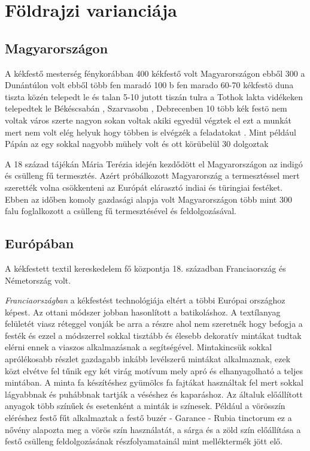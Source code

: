 \documentclass[fontsize=12pt, appendixprefix=true]{scrreprt}
\begin{document}
\section{Földrajzi varianciája}
\subsection{Magyarországon}
A kékfestő mesterség fénykorábban 400 kékfestő volt Magyarországon ebből 300 a Dunántúlon volt ebből több fen maradó 100 b fen marado 60-70 kékfestö duna tiszta közén telepedt le és talan 5-10 jutott tiszán tulra a Tothok lakta vidékeken telepedtek  le Békéscsabán , Szarvasobn , Debrecenben 
10 több kék festö nem voltak város szerte 
nagyon sokan voltak akiki egyedül végztek el ezt a munkát mert nem volt elég helyuk hogy többen is elvégzék a feladatokat .
Mint például Pápán az egy sokkal nagyobb mühely volt és ott körübelül 30 dolgoztak 

A 18 század tájékán Mária Terézia idején kezdődött el Magyarországon az indigó és csülleng fű termesztés.
Azért próbálkozott Magyarország a termesztéssel mert szerették volna csökkenteni az Európát elárasztó indiai és türingiai festéket.
Ebben az időben komoly gazdasági alapja volt Magyarországon több mint 300 falu foglalkozott a csülleng fű termesztésével  és feldolgozásával.
   

\subsection{Európában}
A kékfestett textil kereskedelem fő központja 18. században Franciaország  és Németország volt.

\textit{Franciaországban} a kékfestést technológiája eltért a többi Európai országhoz képest. Az ottani módszer jobban hasonlított a batikoláshoz. A textílanyag felületét viasz réteggel vonják be arra a részre ahol nem szeretnék hogy befogja a festék és ezzel a módszerrel sokkal tisztább és élesebb dekoratív mintákat tudtak elérni ennek a viaszos alkalmazásnak a segítségével.
Mintakincsük sokkal aprólékosabb részlet gazdagabb inkább levélszerű mintákat alkalmaznak, ezek közt elvétve fel tűnik egy két virág motívum mely apró és elhanyagolható a teljes mintában.
A minta fa készítéshez gyümölcs fa fajtákat használtak fel mert sokkal lágyabbnak és puhábbnak tartják a véséshez és kaparáshoz. Az általuk előállított anyagok több színűek és esetenként a minták is színesek.
Például a vörösszín eléréshez festő fűt alkalmaztak a festő buzér - Garance - Rubia tinctorum  ez a nővény alapozta meg a vörös szín használatát, 
a sárga és a zöld szín előállítása a festő csülleng feldolgozásának részfolyamatainál mint melléktermék jött elő.
\end{document}
